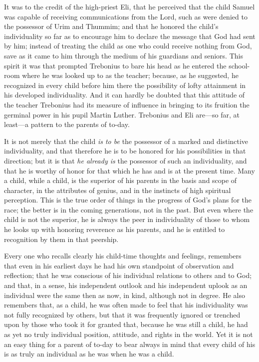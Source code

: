 \documentclass[
]{book}
\begin{document}
It was to the credit of the high-priest Eli, that he perceived that the child Samuel was capable of receiving communications from the Lord, such as were denied to the possessor of Urim and Thummim; and that he honored the child's individuality so far as to encourage him to declare the message that God had sent by him; instead of treating the child as one who could receive nothing from God, save as it came to him through the medium of his guardians and seniors. This spirit it was that prompted Trebonius to bare his head as he entered the school-room where he was looked up to as the teacher; because, as he suggested, he recognized in every child before him there the possibility of lofty attainment in his developed individuality. And it can hardly be doubted that this attitude of the teacher Trebonius had its measure of influence in bringing to its fruition the germinal power in his pupil Martin Luther. Trebonius and Eli are---so far, at least---a pattern to the parents of to-day.

It is not merely that the child \emph{is to be} the possessor of a marked and distinctive individuality, and that therefore he is to be honored for his possibilities in that direction; but it is that \emph{he already is} the possessor of such an individuality, and that he is worthy of honor for that which he has and is at the present time. Many a child, while a child, is the superior of his parents in the basis and scope of character, in the attributes of genius, and in the instincts of high spiritual perception. This is the true order of things in the progress of God's plans for the race; the better is in the coming generations, not in the past. But even where the child is not the superior, he is always the peer in individuality of those to whom he looks up with honoring reverence as his parents, and he is entitled to recognition by them in that peership.

Every one who recalls clearly his child-time thoughts and feelings, remembers that even in his earliest days he had his own standpoint of observation and reflection; that he was conscious of his individual relations to others and to God; and that, in a sense, his independent outlook and his independent uplook as an individual were the same then as now, in kind, although not in degree. He also remembers that, as a child, he was often made to feel that his individuality was not fully recognized by others, but that it was frequently ignored or trenched upon by those who took it for granted that, because he was still a child, he had as yet no truly individual position, attitude, and rights in the world. Yet it is not an easy thing for a parent of to-day to bear always in mind that every child of his is as truly an individual as he was when he was a child.
\end{document}
